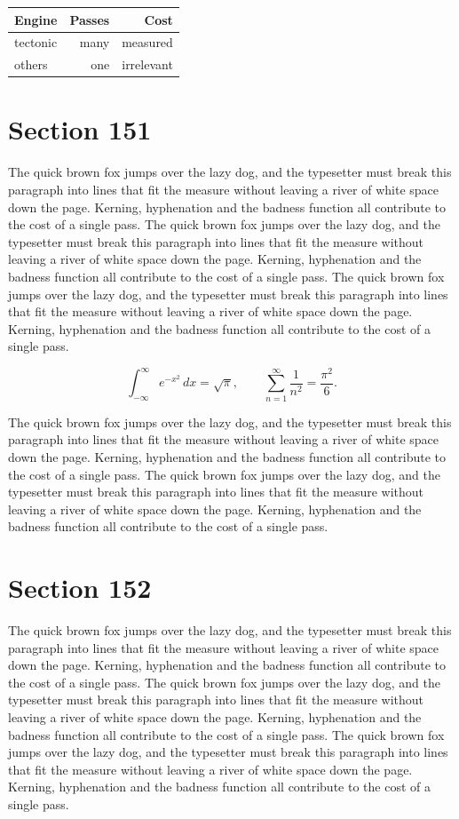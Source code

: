 \documentclass{article}
\begin{document}
\begin{center}
\begin{tabular}{lrr}
\toprule
Engine & Passes & Cost \\
\midrule
tectonic & many & measured \\
others & one & irrelevant \\
\bottomrule
\end{tabular}
\end{center}

\section{Section 151}
The quick brown fox jumps over the lazy dog, and the typesetter must break this paragraph into lines that fit the measure without leaving a river of white space down the page. Kerning, hyphenation and the badness function all contribute to the cost of a single pass. The quick brown fox jumps over the lazy dog, and the typesetter must break this paragraph into lines that fit the measure without leaving a river of white space down the page. Kerning, hyphenation and the badness function all contribute to the cost of a single pass. The quick brown fox jumps over the lazy dog, and the typesetter must break this paragraph into lines that fit the measure without leaving a river of white space down the page. Kerning, hyphenation and the badness function all contribute to the cost of a single pass. 

\begin{equation}
\int_{-\infty}^{\infty} e^{-x^{2}}\,dx = \sqrt{\pi}, \qquad
\sum_{n=1}^{\infty} \frac{1}{n^{2}} = \frac{\pi^{2}}{6}.
\end{equation}

The quick brown fox jumps over the lazy dog, and the typesetter must break this paragraph into lines that fit the measure without leaving a river of white space down the page. Kerning, hyphenation and the badness function all contribute to the cost of a single pass. The quick brown fox jumps over the lazy dog, and the typesetter must break this paragraph into lines that fit the measure without leaving a river of white space down the page. Kerning, hyphenation and the badness function all contribute to the cost of a single pass. 
\section{Section 152}
The quick brown fox jumps over the lazy dog, and the typesetter must break this paragraph into lines that fit the measure without leaving a river of white space down the page. Kerning, hyphenation and the badness function all contribute to the cost of a single pass. The quick brown fox jumps over the lazy dog, and the typesetter must break this paragraph into lines that fit the measure without leaving a river of white space down the page. Kerning, hyphenation and the badness function all contribute to the cost of a single pass. The quick brown fox jumps over the lazy dog, and the typesetter must break this paragraph into lines that fit the measure without leaving a river of white space down the page. Kerning, hyphenation and the badness function all contribute to the cost of a single pass. 
\end{document}
